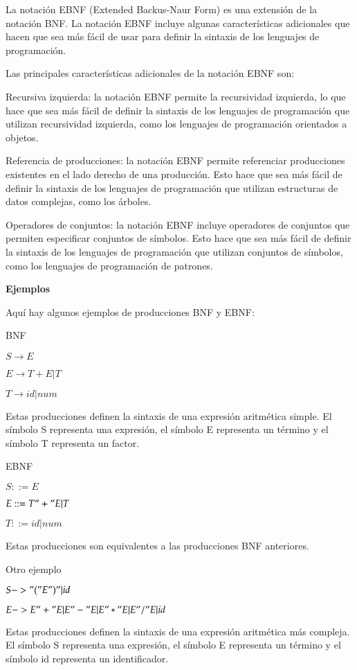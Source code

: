 La notación EBNF (Extended Backus-Naur Form) es una extensión de la notación BNF. La notación EBNF incluye algunas características adicionales que hacen que sea más fácil de usar para definir la sintaxis de los lenguajes de programación.

Las principales características adicionales de la notación EBNF son:

    Recursiva izquierda: la notación EBNF permite la recursividad izquierda, lo que hace que sea más fácil de definir la sintaxis de los lenguajes de programación que utilizan recursividad izquierda, como los lenguajes de programación orientados a objetos.
   
    Referencia de producciones: la notación EBNF permite referenciar producciones existentes en el lado derecho de una producción. Esto hace que sea más fácil de definir la sintaxis de los lenguajes de programación que utilizan estructuras de datos complejas, como los árboles.
    
    Operadores de conjuntos: la notación EBNF incluye operadores de conjuntos que permiten especificar conjuntos de símbolos. Esto hace que sea más fácil de definir la sintaxis de los lenguajes de programación que utilizan conjuntos de símbolos, como los lenguajes de programación de patrones.

\textbf{Ejemplos}

Aquí hay algunos ejemplos de producciones BNF y EBNF:

BNF

$S \xrightarrow{} E$

$E \xrightarrow{} T + E | T$

$T \xrightarrow{} id | num$

Estas producciones definen la sintaxis de una expresión aritmética simple. El símbolo S representa una expresión, el símbolo E representa un término y el símbolo T representa un factor.

EBNF

$S ::= E$

$E ::= T "+" E | T$

$T ::= id | num$

Estas producciones son equivalentes a las producciones BNF anteriores.

Otro ejemplo

$S -> "(" E ")" | id$

$E -> E "+" E | E "-" E | E "*" E | E "/" E | id$

Estas producciones definen la sintaxis de una expresión aritmética más compleja. El símbolo S representa una expresión, el símbolo E representa un término y el símbolo id representa un identificador.


